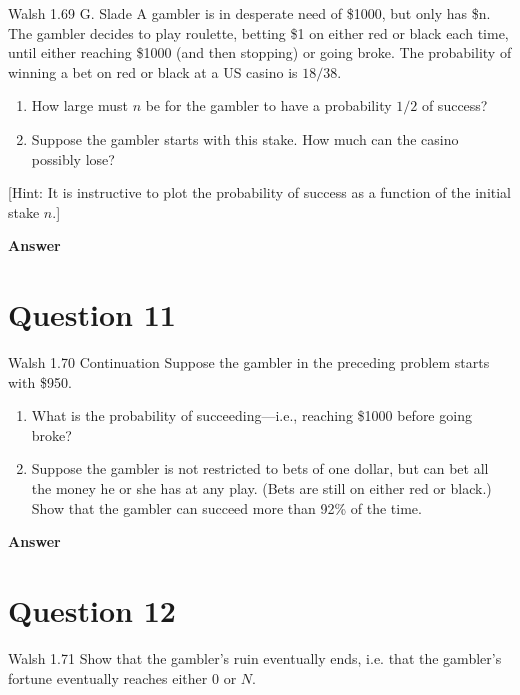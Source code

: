 \documentclass[letterpaper]{article}
\begin{document}
		
		{\color{deepred} Walsh 1.69 G. Slade} A gambler is in desperate need of \$1000, but only has \$n. The gambler decides to play roulette, betting \$1 on either red or black each time, until either reaching \$1000 (and then stopping) or going broke. The probability of winning a bet on red or black at a US casino is $18/38$.
	
\begin{enumerate}
\item[(a)] How large must $n$ be for the gambler to have a probability $1/2$ of success?
\item[(b)] Suppose the gambler starts with this stake. How much can the casino possibly lose?
\end{enumerate}

[Hint: It is instructive to plot the probability of success as a function of the initial stake $n$.]

\textbf{Answer}

\clearpage
		
		\section{Question 11}
		
		{\color{deepred} Walsh 1.70 Continuation} Suppose the gambler in the preceding problem starts with \$950.
	
\begin{enumerate}
\item[(a)] What is the probability of succeeding---i.e., reaching \$1000 before going broke?

\item[(b)] Suppose the gambler is not restricted to bets of one dollar, but can bet all the money he or she has at any play. (Bets are still on either red or black.) Show that the gambler can succeed more than 92\% of the time.

\end{enumerate}
		
		\textbf{Answer}
		
		\clearpage
		
		\section{Question 12}
		
		{\color{deepred} Walsh 1.71} Show that the gambler's ruin eventually ends, i.e. that the gambler's fortune eventually reaches either $0$ or $N$.
	
\end{document}
